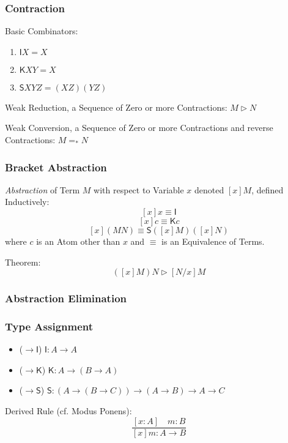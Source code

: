 \subsubsection{Contraction}\label{sec:combinatory_contraction}
\cite{seldin03}

Basic Combinators:
\begin{enumerate}
  \item $\mathsf{I} X = X$
  \item $\mathsf{K} X Y = X$
  \item $\mathsf{S} X Y Z = (X Z) (Y Z)$
\end{enumerate}

Weak Reduction, a Sequence of Zero or more Contractions: $M \rhd N$

Weak Conversion, a Sequence of Zero or more Contractions and reverse
Contractions: $M =_* N$



\subsubsection{Bracket Abstraction}\label{sec:bracket_abstraction}

\emph{Abstraction} of Term $M$ with respect to Variable $x$ denoted
$[x]M$, defined Inductively:\cite{seldin03}
\[
  [x]x \equiv \mathsf{I}
\]\[
  [x]c \equiv \mathsf{K}c
\]\[
  [x](M N) \equiv \mathsf{S}([x]M)([x]N)
\]
where $c$ is an Atom other than $x$ and $\equiv$ is an Equivalence of
Terms.

Theorem:
\[
  ([x]M)N \rhd [N/x]M
\]



\subsubsection{Abstraction Elimination}
\label{sec:abstraction_elimination}



\subsubsection{Type Assignment}\label{sec:combinatory_type}
\cite{seldin03}

\begin{itemize}
  \item ($\rightarrow \mathsf{I}$) $\mathsf{I}: A \rightarrow A$
  \item ($\rightarrow \mathsf{K}$)
    $\mathsf{K}: A \rightarrow (B \rightarrow A)$
  \item ($\rightarrow \mathsf{S}$)
    $\mathsf{S}: (A \rightarrow (B \rightarrow C))
      \rightarrow (A \rightarrow B) \rightarrow A \rightarrow C$
\end{itemize}

Derived Rule (cf. Modus Ponens):
\[
  \frac{
    [x:A] \quad m:B
  }{
    [x]m:A \rightarrow B
  }
\]
